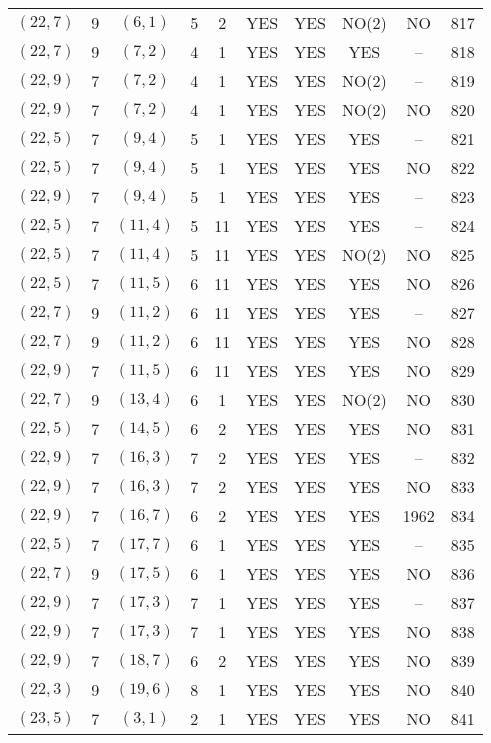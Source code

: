 \begin{longtable}{|c|c|c|c|c|c|c|c|c|c|}
$(22, 7)$ & 9 & $(6, 1)$ & 5 & 2 & YES & YES & NO(2) & NO & 817\\
$(22, 7)$ & 9 & $(7, 2)$ & 4 & 1 & YES & YES & YES & -- & 818\\
$(22, 9)$ & 7 & $(7, 2)$ & 4 & 1 & YES & YES & NO(2) & -- & 819\\
$(22, 9)$ & 7 & $(7, 2)$ & 4 & 1 & YES & YES & NO(2) & NO & 820\\
$(22, 5)$ & 7 & $(9, 4)$ & 5 & 1 & YES & YES & YES & -- & 821\\
$(22, 5)$ & 7 & $(9, 4)$ & 5 & 1 & YES & YES & YES & NO & 822\\
$(22, 9)$ & 7 & $(9, 4)$ & 5 & 1 & YES & YES & YES & -- & 823\\
$(22, 5)$ & 7 & $(11, 4)$ & 5 & 11 & YES & YES & YES & -- & 824\\
$(22, 5)$ & 7 & $(11, 4)$ & 5 & 11 & YES & YES & NO(2) & NO & 825\\
$(22, 5)$ & 7 & $(11, 5)$ & 6 & 11 & YES & YES & YES & NO & 826\\
$(22, 7)$ & 9 & $(11, 2)$ & 6 & 11 & YES & YES & YES & -- & 827\\
$(22, 7)$ & 9 & $(11, 2)$ & 6 & 11 & YES & YES & YES & NO & 828\\
$(22, 9)$ & 7 & $(11, 5)$ & 6 & 11 & YES & YES & YES & NO & 829\\
$(22, 7)$ & 9 & $(13, 4)$ & 6 & 1 & YES & YES & NO(2) & NO & 830\\
$(22, 5)$ & 7 & $(14, 5)$ & 6 & 2 & YES & YES & YES & NO & 831\\
$(22, 9)$ & 7 & $(16, 3)$ & 7 & 2 & YES & YES & YES & -- & 832\\
$(22, 9)$ & 7 & $(16, 3)$ & 7 & 2 & YES & YES & YES & NO & 833\\
$(22, 9)$ & 7 & $(16, 7)$ & 6 & 2 & YES & YES & YES & 1962 & 834\\
$(22, 5)$ & 7 & $(17, 7)$ & 6 & 1 & YES & YES & YES & -- & 835\\
$(22, 7)$ & 9 & $(17, 5)$ & 6 & 1 & YES & YES & YES & NO & 836\\
$(22, 9)$ & 7 & $(17, 3)$ & 7 & 1 & YES & YES & YES & -- & 837\\
$(22, 9)$ & 7 & $(17, 3)$ & 7 & 1 & YES & YES & YES & NO & 838\\
$(22, 9)$ & 7 & $(18, 7)$ & 6 & 2 & YES & YES & YES & NO & 839\\
$(22, 3)$ & 9 & $(19, 6)$ & 8 & 1 & YES & YES & YES & NO & 840\\
$(23, 5)$ & 7 & $(3, 1)$ & 2 & 1 & YES & YES & YES & NO & 841\\

\end{longtable}
